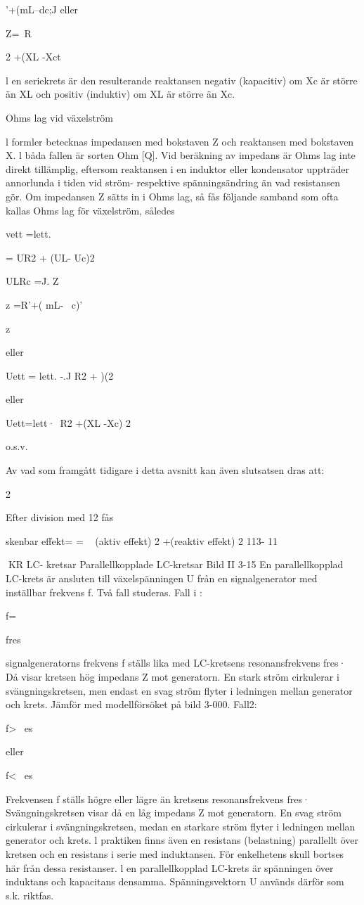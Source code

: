 \documentclass[a4paper,twoside,twocolumn,openright]{book}
\begin{document}
{{{{{'+(mL--dc;J eller

Z=~R

2
+(XL -Xct

l en seriekrets är den resulterande
reaktansen negativ (kapacitiv) om Xc är
större än XL och positiv (induktiv) om XL är
större än Xc.

Ohms lag vid växelström

l formler betecknas impedansen med bokstaven Z och reaktansen med bokstaven X.
l båda fallen är sorten Ohm [Q].
Vid beräkning av impedans är Ohms lag
inte direkt tillämplig, eftersom reaktansen i
en induktor eller kondensator uppträder annorlunda i tiden vid ström- respektive spänningsändring än vad resistansen gör.
Om impedansen Z sätts in i Ohms lag, så
fås följande samband som ofta kallas Ohms
lag för växelström, således

vett =lett.

= UR2 + (UL- Uc)2

ULRc =J. Z

z =R'+( mL- ~c)'

z

eller

Uett = lett. -.J R2 + )(2

eller

Uett=lett·~R2 +(XL -Xc) 2

o.s.v.

Av vad som framgått tidigare i detta avsnitt
kan även slutsatsen dras att:

2

Efter division med 12 fås

skenbar effekt=
= ~ (aktiv effekt) 2 +(reaktiv effekt) 2
113- 11

KR
LC- kretsar
Parallellkopplade LC-kretsar
Bild II 3-15
En parallellkopplad LC-krets är ansluten till
växelspänningen U från en signalgenerator
med inställbar frekvens f. Två fall studeras.
Fall i :

f=

fres

signalgeneratorns frekvens f ställs lika
med LC-kretsens resonansfrekvens fres· Då
visar kretsen hög impedans Z mot generatorn. En stark ström cirkulerar i svängningskretsen, men endast en svag ström flyter i
ledningen mellan generator och krets.
Jämför med modellförsöket på bild 3-000.
Fall2:

f> ~es

eller

f< ~es

Frekvensen f ställs högre eller lägre än
kretsens resonansfrekvens fres·
Svängningskretsen visar då en låg impedans Z mot generatorn. En svag ström cirkulerar i svängningskretsen, medan en starkare ström flyter i ledningen mellan generator och krets.
l praktiken finns även en resistans (belastning) parallellt över kretsen och en resistans i serie med induktansen. För enkelhetens skull bortses här från dessa resistanser.
l en parallellkopplad LC-krets är spänningen över induktans och kapacitans densamma. Spänningsvektorn U används därför som s.k. riktfas.

}}}}}
\end{document}
